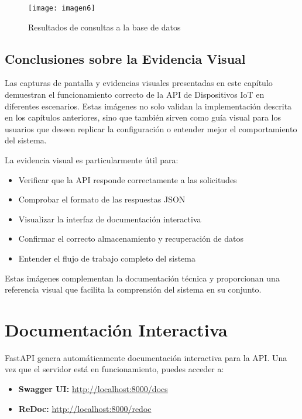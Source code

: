 \documentclass[12pt,letterpaper]{report}
\begin{document}
\begin{figure}[h]
    \centering
    \texttt{[image: imagen6]}
    \caption{Resultados de consultas a la base de datos}
    \label{fig:resultados}
\end{figure}


\section{Conclusiones sobre la Evidencia Visual}

Las capturas de pantalla y evidencias visuales presentadas en este capítulo demuestran el funcionamiento correcto de la API de Dispositivos IoT en diferentes escenarios. Estas imágenes no solo validan la implementación descrita en los capítulos anteriores, sino que también sirven como guía visual para los usuarios que deseen replicar la configuración o entender mejor el comportamiento del sistema.

La evidencia visual es particularmente útil para:
\begin{itemize}
    \item Verificar que la API responde correctamente a las solicitudes
    \item Comprobar el formato de las respuestas JSON
    \item Visualizar la interfaz de documentación interactiva
    \item Confirmar el correcto almacenamiento y recuperación de datos
    \item Entender el flujo de trabajo completo del sistema
\end{itemize}

Estas imágenes complementan la documentación técnica y proporcionan una referencia visual que facilita la comprensión del sistema en su conjunto.

\chapter{Documentación Interactiva}

FastAPI genera automáticamente documentación interactiva para la API. Una vez que el servidor está en funcionamiento, puedes acceder a:

\begin{itemize}
    \item \textbf{Swagger UI:} \url{http://localhost:8000/docs}
    \item \textbf{ReDoc:} \url{http://localhost:8000/redoc}
\end{itemize}
\end{document}

